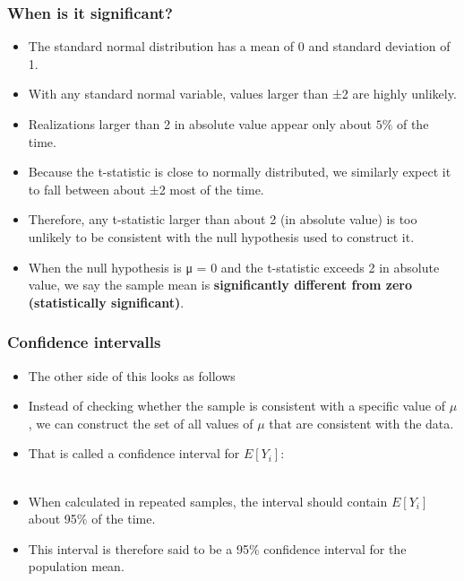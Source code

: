\documentclass{beamer}
\begin{document}
\begin{frame}
\frametitle{When is it significant?}

\begin{itemize}
	\item The standard normal distribution has a mean of 0 and standard
deviation of 1. 
	\item With any standard normal variable, values larger than ±2 are highly unlikely.
	\item Realizations larger than 2 in absolute value appear only about $5\%$ of the time. 
  \item Because the t-statistic is close to normally distributed, we similarly expect it to fall between about ±2
most of the time. 
	\item Therefore, any t-statistic larger than about 2 (in absolute value) is too unlikely to be consistent with the null hypothesis used to construct it. 
	\item When the null hypothesis is μ = 0 and the t-statistic exceeds 2 in absolute value, we say the sample mean is \textbf{significantly different from zero (statistically significant)}.
\end{itemize}

\end{frame}


\begin{frame}
\frametitle{Confidence intervalls}

\begin{itemize}
	\item The other side of this looks as follows
	\item Instead of checking whether the sample is consistent with a specific
value of $\mu$, we can construct the set of all values of $\mu$ that are consistent
with the data.
	\item That is called a confidence interval for $E[Y_i]$:
		\begin{equation*}
		[\bar{Y}-2\times{\hat{SE}(\bar{Y})},\bar{Y}+2\times{\hat{SE}(\bar{Y})}]
		\end{equation*} \\
	\item When calculated in repeated samples, the interval should contain $E[Y_i]$ about 95\% of the time.
	\item This interval is therefore said to be a 95\% confidence interval for the population mean.
\end{itemize}

\end{frame}
\end{document}
